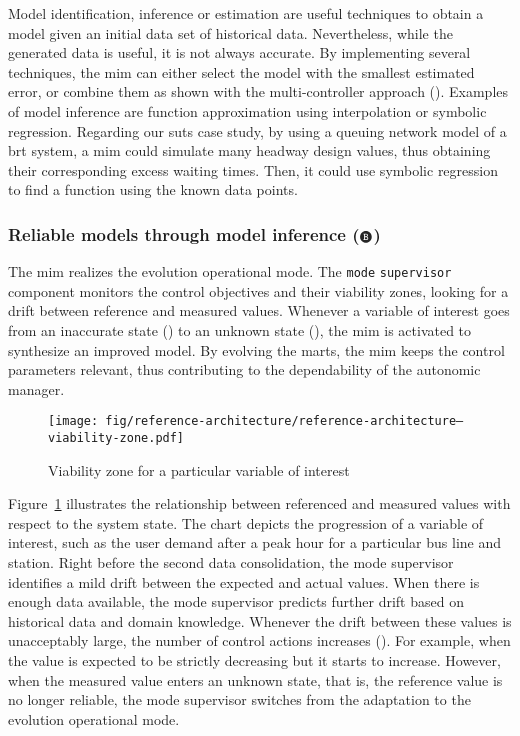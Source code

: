 Model identification, inference or estimation are useful techniques to obtain a model given an initial data set of historical data. Nevertheless, while the generated data is useful, it is not always accurate. By implementing several techniques, the \gls{mim} can either select the model with the smallest estimated error, or combine them as shown with the multi-controller approach (). Examples of model inference are function approximation using interpolation or symbolic regression. Regarding our \gls{suts} case study, by using a queuing network model of a \gls{brt} system, a \gls{mim} could simulate many headway design values, thus obtaining their corresponding excess waiting times. Then, it could use symbolic regression to find a function using the known data points.

\subsubsection[Reliable models through model inference]{Reliable models through model inference ($\encircleblack{B}$)}

The \gls{mim} realizes the evolution operational mode. The \texttt{mode} \texttt{supervisor} component monitors the control objectives and their viability zones, looking for a drift between reference and measured values. Whenever a variable of interest goes from an inaccurate state () to an unknown state (), the \gls{mim} is activated to synthesize an improved model. By evolving the \glspl{mart}, the \gls{mim} keeps the control parameters relevant, thus contributing to the dependability of the autonomic manager.

\begin{figure}[h]
	\centering
	\texttt{[image: fig/reference-architecture/reference-architecture--viability-zone.pdf]}
	\caption{Viability zone for a particular variable of interest}
	\label{fig:reference-architecture--viability-zone}
\end{figure}

Figure~\ref{fig:reference-architecture--viability-zone} illustrates the relationship between referenced and measured values with respect to the system state. The chart depicts the progression of a variable of interest, such as the user demand after a peak hour for a particular bus line and station. Right before the second data consolidation, the mode supervisor identifies a mild drift between the expected and actual values. When there is enough data available, the mode supervisor predicts further drift based on historical data and domain knowledge. Whenever the drift between these values is unacceptably large, the number of control actions increases (). For example, when the value is expected to be strictly decreasing but it starts to increase. However, when the measured value enters an unknown state, that is, the reference value is no longer reliable, the mode supervisor switches from the adaptation to the evolution operational mode.

